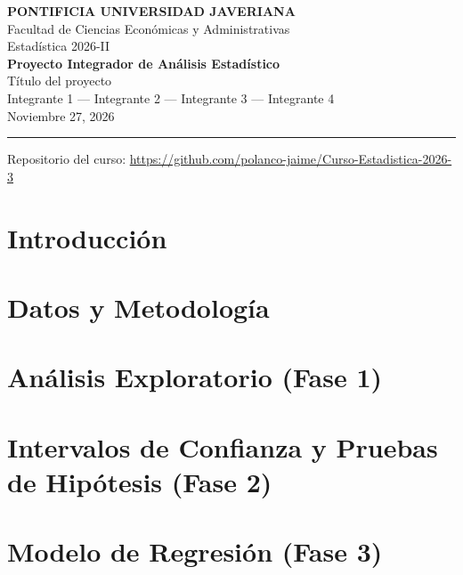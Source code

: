 \documentclass[11pt, a4paper]{article}
\begin{document}
\begin{center}
{\large\bfseries PONTIFICIA UNIVERSIDAD JAVERIANA}\\[3pt]
Facultad de Ciencias Econ\'omicas y Administrativas\\[2pt]
Estad\'istica 2026-II\\[6pt]
{\LARGE\bfseries Proyecto Integrador de An\'alisis Estad\'istico}\\[6pt]
{\large T\'itulo del proyecto}\\[10pt]
Integrante 1 --- Integrante 2 --- Integrante 3 --- Integrante 4\\[3pt]
Noviembre 27, 2026
\end{center}

\vspace{6pt}
\rule{\linewidth}{0.5pt}
\vspace{2pt}
{\centering\small Repositorio del curso: \url{https://github.com/polanco-jaime/Curso-Estadistica-2026-3}\par}

\tableofcontents
\newpage

\section{Introducci\'on}

\section{Datos y Metodolog\'ia}

\section{An\'alisis Exploratorio (Fase 1)}

\section{Intervalos de Confianza y Pruebas de Hip\'otesis (Fase 2)}

\section{Modelo de Regresi\'on (Fase 3)}
\end{document}
